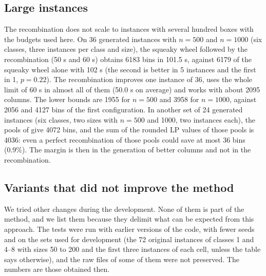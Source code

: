 \subsection{Large instances}
\label{sec:e-scale}

The recombination does not scale to instances with several hundred boxes with the budgets used here. On 36 generated instances with $n=500$ and $n=1000$ (six classes, three instances per class and size), the squeaky wheel followed by the recombination (50 s and 60 s) obtains 6183 bins in 101.5 s,
against 6179 of the squeaky wheel alone with 102 s (the second is better in 5 instances and the first in 1, $p=0.22$). The recombination improves one instance of 36, uses the whole limit of 60 s in almost all of them (50.0 s on average) and works with about 2095 columns.
The lower bounds are 1955 for $n=500$ and 3958 for $n=1000$, against 2056 and 4127 bins of the first configuration. In another set of 24 generated instances (six classes, two sizes with $n=500$ and 1000, two instances each), the pools of \cfgbal{} give
4072 bins, and the sum of the rounded LP values of those pools is 4036: even a perfect recombination of those pools could save at most 36 bins (0.9\%). The margin
is then in the generation of better columns and not in the recombination.

\subsection{Variants that did not improve the method}
\label{sec:e-negative}

We tried other changes during the development. None of them is part of the method, and we list them because they delimit what can be expected from this approach. The tests were run
with earlier versions of the code, with fewer seeds and on the sets used for development (the 72 original instances of classes 1 and 4--8 with sizes 50 to 200 and the first three instances of each cell,
unless the table says otherwise), and the raw files of some of them were not preserved. The numbers are those obtained then.

